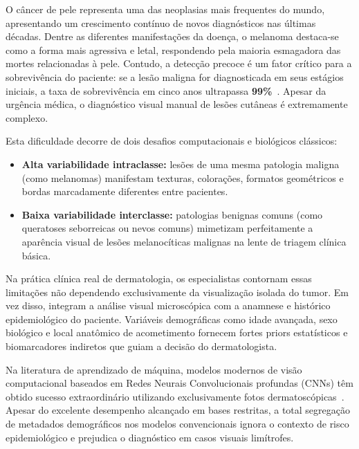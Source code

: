 \documentclass[10pt,twocolumn,letterpaper]{article}
\begin{document}
O câncer de pele representa uma das neoplasias mais frequentes do mundo, apresentando um crescimento contínuo de novos diagnósticos nas últimas décadas. Dentre as diferentes manifestações da doença, o melanoma destaca-se como a forma mais agressiva e letal, respondendo pela maioria esmagadora das mortes relacionadas à pele. Contudo, a detecção precoce é um fator crítico para a sobrevivência do paciente: se a lesão maligna for diagnosticada em seus estágios iniciais, a taxa de sobrevivência em cinco anos ultrapassa \textbf{99\%}~\cite{esteva2017dermatologist}. Apesar da urgência médica, o diagnóstico visual manual de lesões cutâneas é extremamente complexo. 

Esta dificuldade decorre de dois desafios computacionais e biológicos clássicos:
\begin{itemize}
    \item \textbf{Alta variabilidade intraclasse:} lesões de uma mesma patologia maligna (como melanomas) manifestam texturas, colorações, formatos geométricos e bordas marcadamente diferentes entre pacientes.
    \item \textbf{Baixa variabilidade interclasse:} patologias benignas comuns (como queratoses seborreicas ou nevos comuns) mimetizam perfeitamente a aparência visual de lesões melanocíticas malignas na lente de triagem clínica básica.
\end{itemize}

Na prática clínica real de dermatologia, os especialistas contornam essas limitações não dependendo exclusivamente da visualização isolada do tumor. Em vez disso, integram a análise visual microscópica com a anamnese e histórico epidemiológico do paciente. Variáveis demográficas como idade avançada, sexo biológico e local anatômico de acometimento fornecem fortes priors estatísticos e biomarcadores indiretos que guiam a decisão do dermatologista. 

Na literatura de aprendizado de máquina, modelos modernos de visão computacional baseados em Redes Neurais Convolucionais profundas (CNNs) têm obtido sucesso extraordinário utilizando exclusivamente fotos dermatoscópicas~\cite{esteva2017dermatologist, he2016deep}. Apesar do excelente desempenho alcançado em bases restritas, a total segregação de metadados demográficos nos modelos convencionais ignora o contexto de risco epidemiológico e prejudica o diagnóstico em casos visuais limítrofes.
\end{document}
